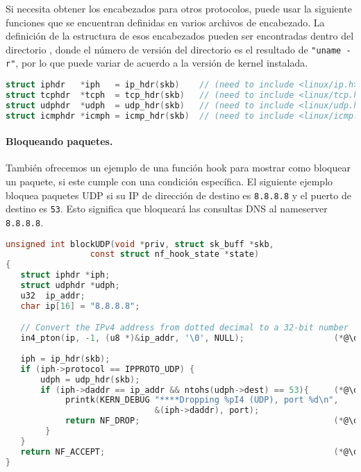 Si necesita obtener los encabezados para otros protocolos, puede usar la siguiente funciones que se encuentran definidas en varios archivos de encabezado. La definición de la estructura de esos encabezados pueden ser encontradas dentro del directorio , donde el número de versión del directorio es el resultado de \texttt{"uname -r"}, por lo que puede variar de acuerdo a la versión de kernel instalada.

\begin{lstlisting}[language=C]
struct iphdr   *iph   = ip_hdr(skb)    // (need to include <linux/ip.h>) 
struct tcphdr  *tcph  = tcp_hdr(skb)   // (need to include <linux/tcp.h>) 
struct udphdr  *udph  = udp_hdr(skb)   // (need to include <linux/udp.h>) 
struct icmphdr *icmph = icmp_hdr(skb)  // (need to include <linux/icmp.h>) 
\end{lstlisting}
 

\paragraph{Bloqueando paquetes.} 
También ofrecemos un ejemplo de una función hook para mostrar como bloquear un paquete, si este cumple con una condición específica. El siguiente ejemplo bloquea paquetes UDP si su IP de dirección de destino es \texttt{8.8.8.8} y el puerto de destino es \texttt{53}. Esto significa que bloqueará las consultas DNS al nameserver \texttt{8.8.8.8}. 

\begin{lstlisting}[language=C, caption={Code example: blocking UDP}]
unsigned int blockUDP(void *priv, struct sk_buff *skb,
                 const struct nf_hook_state *state)
{
   struct iphdr *iph;
   struct udphdr *udph;
   u32  ip_addr;
   char ip[16] = "8.8.8.8";

   // Convert the IPv4 address from dotted decimal to a 32-bit number
   in4_pton(ip, -1, (u8 *)&ip_addr, '\0', NULL);                  (*@\ding{202}@*)
   
   iph = ip_hdr(skb);
   if (iph->protocol == IPPROTO_UDP) {
       udph = udp_hdr(skb);                                         
       if (iph->daddr == ip_addr && ntohs(udph->dest) == 53){     (*@\ding{203}@*)
            printk(KERN_DEBUG "****Dropping %pI4 (UDP), port %d\n", 
                              &(iph->daddr), port);                 
            return NF_DROP;                                       (*@\ding{204}@*)
        }
   }
   return NF_ACCEPT;                                              (*@\ding{205}@*)
}
\end{lstlisting}


